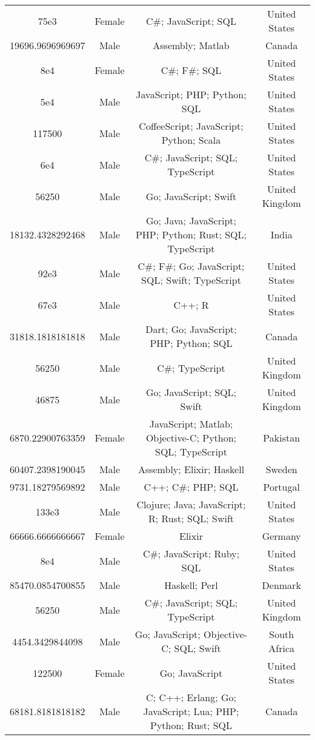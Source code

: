 \begin{center}
\begin{tabular}{ |c|c|c|c| }
75e3  &  Female  &  C\#; JavaScript; SQL  &  United States  \\ 
19696.9696969697  &  Male  &  Assembly; Matlab  &  Canada  \\ 
8e4  &  Female  &  C\#; F\#; SQL  &  United States  \\ 
5e4  &  Male  &  JavaScript; PHP; Python; SQL  &  United States  \\ 
117500  &  Male  &  CoffeeScript; JavaScript; Python; Scala  &  United States  \\ 
6e4  &  Male  &  C\#; JavaScript; SQL; TypeScript  &  United States  \\ 
56250  &  Male  &  Go; JavaScript; Swift  &  United Kingdom  \\ 
18132.4328292468  &  Male  &  Go; Java; JavaScript; PHP; Python; Rust; SQL; TypeScript  &  India  \\ 
92e3  &  Male  &  C\#; F\#; Go; JavaScript; SQL; Swift; TypeScript  &  United States  \\ 
67e3  &  Male  &  C++; R  &  United States  \\ 
31818.1818181818  &  Male  &  Dart; Go; JavaScript; PHP; Python; SQL  &  Canada  \\ 
56250  &  Male  &  C\#; TypeScript  &  United Kingdom  \\ 
46875  &  Male  &  Go; JavaScript; SQL; Swift  &  United Kingdom  \\ 
6870.22900763359  &  Female  &  JavaScript; Matlab; Objective-C; Python; SQL; TypeScript  &  Pakistan  \\ 
60407.2398190045  &  Male  &  Assembly; Elixir; Haskell  &  Sweden  \\ 
9731.18279569892  &  Male  &  C++; C\#; PHP; SQL  &  Portugal  \\ 
133e3  &  Male  &  Clojure; Java; JavaScript; R; Rust; SQL; Swift  &  United States  \\ 
66666.6666666667  &  Female  &  Elixir  &  Germany  \\ 
8e4  &  Male  &  C\#; JavaScript; Ruby; SQL  &  United States  \\ 
85470.0854700855  &  Male  &  Haskell; Perl  &  Denmark  \\ 
56250  &  Male  &  C\#; JavaScript; SQL; TypeScript  &  United Kingdom  \\ 
4454.3429844098  &  Male  &  Go; JavaScript; Objective-C; SQL; Swift  &  South Africa  \\ 
122500  &  Female  &  Go; JavaScript  &  United States  \\ 
68181.8181818182  &  Male  &  C; C++; Erlang; Go; JavaScript; Lua; PHP; Python; Rust; SQL  &  Canada  \\ 

\end{tabular}
\end{center}
